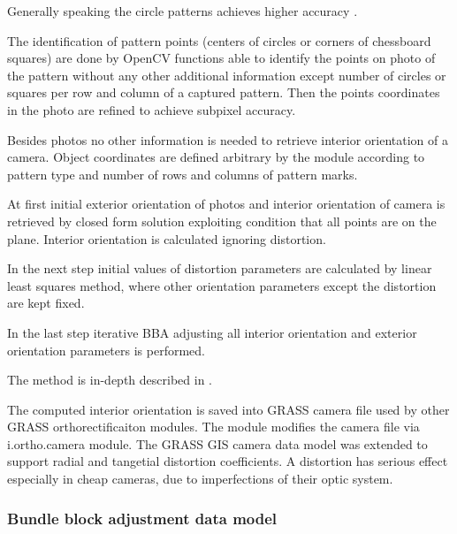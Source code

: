 \documentclass[a4paper,12pt]{article}
\begin{document}
Generally speaking the circle patterns achieves higher accuracy \cite{camera_calibration2013opencv}.

The identification of pattern points (centers of circles or corners of chessboard squares) 
are done by OpenCV functions able to identify the points on photo of the pattern 
without any other additional information except number of circles or squares per row and column
of a captured pattern. Then the points coordinates in the photo are refined to achieve subpixel accuracy.

Besides photos no other information is needed to retrieve interior orientation of a camera.
Object coordinates are defined
arbitrary by the module according to pattern type and number of rows and columns of pattern marks.

At first  initial exterior orientation of photos and interior orientation of camera is retrieved 
by closed form solution exploiting condition that all points are on the plane.
Interior orientation is calculated ignoring distortion.

In the next step initial values of distortion parameters are calculated by linear least squares method, 
where other orientation parameters except the distortion are kept fixed.

In the last step iterative BBA adjusting all interior orientation and exterior orientation parameters 
is performed.

The method is in-depth described 
in \cite{zhang2000flexible}.



The computed interior orientation is saved into GRASS camera file used by other GRASS 
orthorectificaiton modules. The module modifies the camera file via i.ortho.camera module.
The GRASS GIS camera data model was extended to support radial and tangetial distortion coefficients. 
A distortion has serious effect especially in cheap cameras, due to imperfections of their optic system.

\subsubsection{Bundle block adjustment data model}
 
\end{document}

